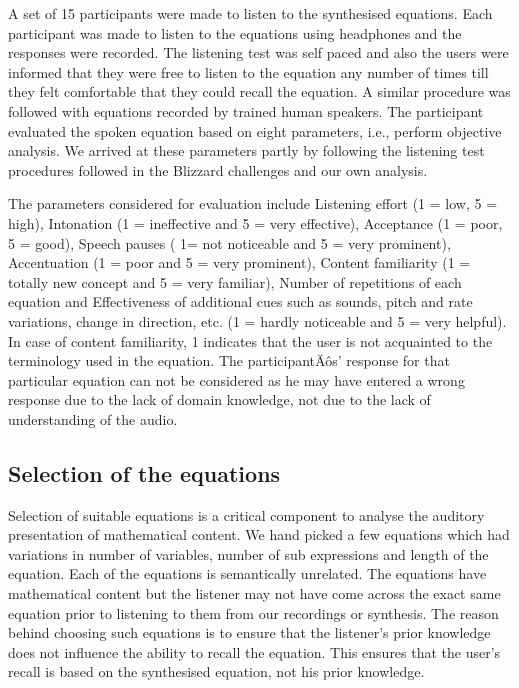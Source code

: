 \documentclass{article}
\begin{document}
A set of 15 participants were made to listen to the synthesised equations. Each participant was made to listen to the equations using headphones and the responses were recorded. The listening test was self paced and also the users were informed that they were free to listen to the equation any number of times till they felt comfortable that they could recall the equation.  A similar procedure was followed with equations recorded by trained human speakers. The participant  evaluated the spoken equation based on eight parameters, i.e., perform objective analysis. We arrived at these parameters partly by following the listening test procedures followed in the Blizzard challenges \cite{hinterleitner2011evaluation} and our own analysis.


The parameters considered for evaluation include Listening effort (1 = low, 5 = high), Intonation (1 = ineffective and 5 = very effective), Acceptance (1 = poor, 5 = good), Speech pauses ( 1= not noticeable and 5 = very prominent), Accentuation (1 = poor and 5 = very prominent), Content familiarity (1 = totally new concept and 5 = very familiar), Number of repetitions of each equation and Effectiveness of additional cues such as sounds, pitch and rate variations, change in direction, etc. (1 = hardly noticeable and 5 = very helpful). In case of content familiarity, 1 indicates that the user is not acquainted to the terminology used in the equation. The participantÄôs' response for that particular equation can not be considered as he may have entered a wrong response due to the lack of domain knowledge, not due to the lack of understanding of the audio.


\subsection{Selection of the equations}
\label{ssec:equations}

Selection  of suitable equations is a critical component to analyse the auditory presentation of mathematical content. We hand picked a few equations which had variations in number of variables, number of sub expressions and length of the equation.  Each of the equations is semantically unrelated. The equations have mathematical content but the listener may not have come across the exact same equation prior to listening to them from our recordings or synthesis. The reason behind choosing such equations is to ensure that the listener's prior knowledge does not influence the ability to recall the equation. This ensures that the user's recall is based on the synthesised equation, not his prior knowledge.
\end{document}
